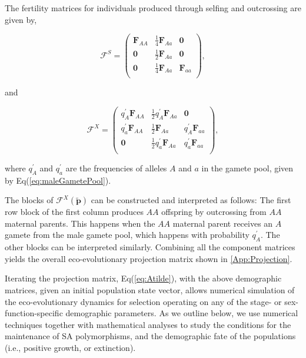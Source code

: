 \documentclass[11pt]{article}
\def\mbf#1{\mathbf{#1}}
\def\mcal#1{\mathcal{#1}}
\begin{document}
The fertility matrices for individuals produced through selfing and outcrossing are given by, 
\begin{linenomath*}
\begin{equation} \label{eq:BlkFS}
	\mcal{F}^S = 
			\left(
			\begin{array}{ccc}
				\mbf{F}_{AA} & \frac{1}{4} \mbf{F}_{Aa} & \mbf{0}  \\
				\mbf{0}  & \frac{1}{2} \mbf{F}_{Aa} & \mbf{0}  \\
				\mbf{0} & \frac{1}{4} \mbf{F}_{Aa} & \mbf{F}_{aa}\\
			\end{array} \right), 
\end{equation}
\end{linenomath*}
\noindent and 
\begin{linenomath*}
\begin{equation} \label{eq:BlkFX}
	\mcal{F}^X = 
			\left(
			\begin{array}{ccc}
				q^{\prime}_{A} \mbf{F}_{AA} & \frac{1}{2} q^{\prime}_{A} \mbf{F}_{Aa} & \mbf{0}  \\ 
				q^{\prime}_{a} \mbf{F}_{AA} & \frac{1}{2} \mbf{F}_{Aa} & q^{\prime}_{A} \mbf{F}_{aa}  \\ 
				\mbf{0}  & \frac{1}{2} q^{\prime}_{a} \mbf{F}_{Aa} & q^{\prime}_{a} \mbf{F}_{aa}  \\
			\end{array} \right),
\end{equation}
\end{linenomath*}
\noindent where $q^{\prime}_A$ and $q^{\prime}_a$ are the frequencies of alleles $A$ and $a$ in the gamete pool, given by Eq(\ref{eq:maleGametePool}). 

The blocks of $\mcal{F}^X(\tilde{\mbf{p}})$ can be constructed and interpreted as follows: The first row block of the first column produces $AA$ offspring by outcrossing from $AA$ maternal parents. This happens when the $AA$ maternal parent receives an $A$ gamete from the male gamete pool, which happens with probability $q^{\prime}_{A}$. The other blocks can be interpreted similarly. Combining all the component matrices yields the overall eco-evolutionary projection matrix shown in \ref{App:Projection}.

Iterating the projection matrix, Eq(\ref{eq:Atilde}), with the above demographic matrices, given an initial population state vector, allows numerical simulation of the eco-evolutionary dynamics for selection operating on any of the stage- or sex-function-specific demographic parameters. As we outline below, we use numerical techniques together with mathematical analyses to study the conditions for the maintenance of SA polymorphisms, and the demographic fate of the populations (i.e., positive growth, or extinction).
\end{document}

